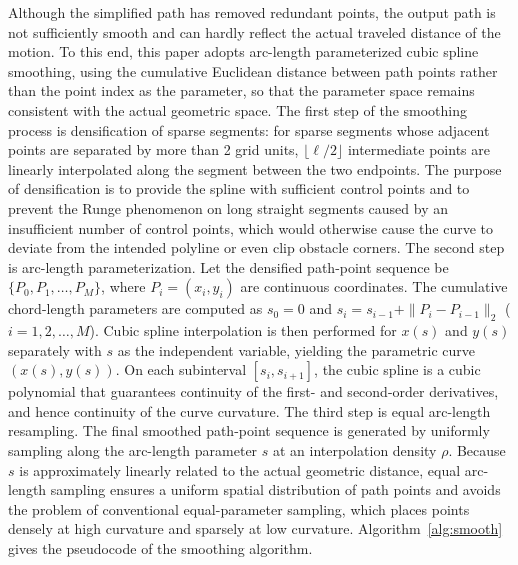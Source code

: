 \documentclass[lettersize,journal]{IEEEtran}
\begin{document}
Although the simplified path has removed redundant points, the output path is not sufficiently smooth and can hardly reflect the actual traveled distance of the motion. To this end, this paper adopts arc-length parameterized cubic spline smoothing, using the cumulative Euclidean distance between path points rather than the point index as the parameter, so that the parameter space remains consistent with the actual geometric space. The first step of the smoothing process is densification of sparse segments: for sparse segments whose adjacent points are separated by more than 2 grid units, $\lfloor \ell / 2 \rfloor$ intermediate points are linearly interpolated along the segment between the two endpoints. The purpose of densification is to provide the spline with sufficient control points and to prevent the Runge phenomenon on long straight segments caused by an insufficient number of control points, which would otherwise cause the curve to deviate from the intended polyline or even clip obstacle corners. The second step is arc-length parameterization. Let the densified path-point sequence be $\{P_0, P_1, \ldots, P_M\}$, where $P_i = (x_i, y_i)$ are continuous coordinates. The cumulative chord-length parameters are computed as $s_0 = 0$ and $s_i = s_{i-1} + \|P_i - P_{i-1}\|_2$ ($i = 1, 2, \ldots, M$). Cubic spline interpolation is then performed for $x(s)$ and $y(s)$ separately with $s$ as the independent variable, yielding the parametric curve $(x(s), y(s))$. On each subinterval $[s_i, s_{i+1}]$, the cubic spline is a cubic polynomial that guarantees continuity of the first- and second-order derivatives, and hence continuity of the curve curvature. The third step is equal arc-length resampling. The final smoothed path-point sequence is generated by uniformly sampling along the arc-length parameter $s$ at an interpolation density $\rho$. Because $s$ is approximately linearly related to the actual geometric distance, equal arc-length sampling ensures a uniform spatial distribution of path points and avoids the problem of conventional equal-parameter sampling, which places points densely at high curvature and sparsely at low curvature. Algorithm~\textcolor{blue}{\ref{alg:smooth}} gives the pseudocode of the smoothing algorithm.
\end{document}

